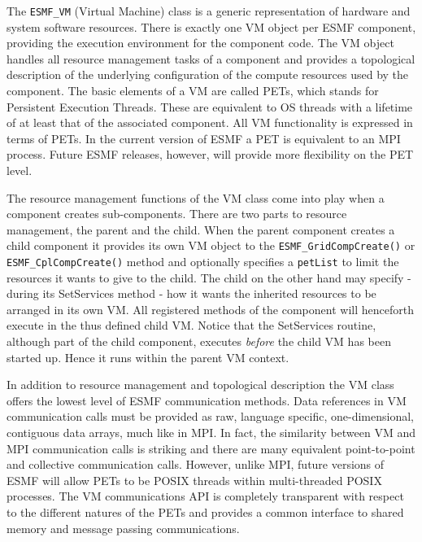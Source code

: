 
The {\tt ESMF\_VM} (Virtual Machine) class is a generic representation of hardware and system software resources. There is exactly one VM object per ESMF component, providing the execution environment for the component code. The VM object handles all resource management tasks of a component and provides a topological description of the underlying configuration of the compute resources used by the component. The basic elements of a VM are called PETs, which stands for Persistent Execution Threads.  These are equivalent to OS threads with a lifetime of at least that of the associated component. All VM functionality is expressed in terms of PETs. In the current version of ESMF a PET is equivalent to an MPI process. Future ESMF releases, however, will provide more flexibility on the PET level.

The resource management functions of the VM class come into play when a component creates sub-components. There are two parts to resource management, the parent and the child. When the parent component creates a child component it provides its own VM object to the {\tt ESMF\_GridCompCreate()} or {\tt ESMF\_CplCompCreate()} method and optionally specifies a {\tt petList} to limit the resources it wants to give to the child. The child on the other hand may specify - during its SetServices method - how it wants the inherited resources to be arranged in its own VM. All registered methods of the component will henceforth execute in the thus defined child VM. Notice that the SetServices routine, although part of the child component, executes {\em before} the child VM has been started up. Hence it runs within the parent VM context.

In addition to resource management and topological description the VM class offers the lowest level of ESMF communication methods. Data references in VM communication calls must be provided as raw, language specific, one-dimensional, contiguous data arrays, much like in MPI. In fact, the similarity between VM and MPI communication calls is striking and there are many equivalent point-to-point and collective communication calls. However, unlike MPI, future versions of ESMF will allow PETs to be POSIX threads within multi-threaded POSIX processes. The VM communications API is completely transparent with respect to the different natures of the PETs and provides a common interface to shared memory and message passing communications.

